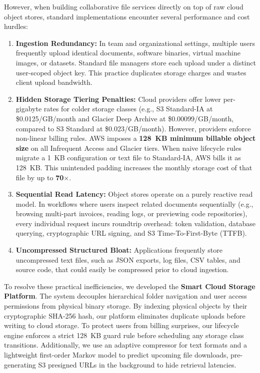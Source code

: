 \documentclass[conference]{IEEEtran}
\begin{document}
However, when building collaborative file services directly on top of raw cloud object stores, standard implementations encounter several performance and cost hurdles:
\begin{enumerate}
    \item \textbf{Ingestion Redundancy:} In team and organizational settings, multiple users frequently upload identical documents, software binaries, virtual machine images, or datasets. Standard file managers store each upload under a distinct user-scoped object key. This practice duplicates storage charges and wastes client upload bandwidth.
    \item \textbf{Hidden Storage Tiering Penalties:} Cloud providers offer lower per-gigabyte rates for colder storage classes (e.g., S3 Standard-IA at \$0.0125/GB/month and Glacier Deep Archive at \$0.00099/GB/month, compared to S3 Standard at \$0.023/GB/month). However, providers enforce non-linear billing rules. AWS imposes a \textbf{128~KB minimum billable object size} on all Infrequent Access and Glacier tiers. When naive lifecycle rules migrate a 1~KB configuration or text file to Standard-IA, AWS bills it as 128~KB. This unintended padding increases the monthly storage cost of that file by up to \textbf{70$\times$}.
    \item \textbf{Sequential Read Latency:} Object stores operate on a purely reactive read model. In workflows where users inspect related documents sequentially (e.g., browsing multi-part invoices, reading logs, or previewing code repositories), every individual request incurs roundtrip overhead: token validation, database querying, cryptographic URL signing, and S3 Time-To-First-Byte (TTFB).
    \item \textbf{Uncompressed Structured Bloat:} Applications frequently store uncompressed text files, such as JSON exports, log files, CSV tables, and source code, that could easily be compressed prior to cloud ingestion.
\end{enumerate}

To resolve these practical inefficiencies, we developed the \textbf{Smart Cloud Storage Platform}. The system decouples hierarchical folder navigation and user access permissions from physical binary storage. By indexing physical objects by their cryptographic SHA-256 hash, our platform eliminates duplicate uploads before writing to cloud storage. To protect users from billing surprises, our lifecycle engine enforces a strict 128~KB guard rule before scheduling any storage class transitions. Additionally, we use an adaptive compressor for text formats and a lightweight first-order Markov model to predict upcoming file downloads, pre-generating S3 presigned URLs in the background to hide retrieval latencies.
\end{document}
